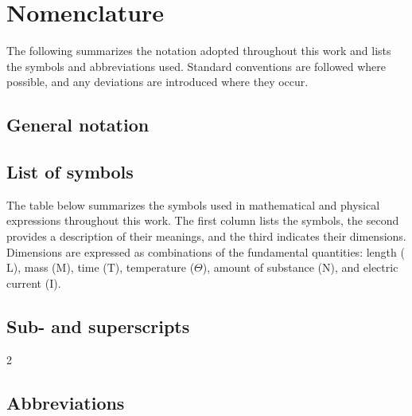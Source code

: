 %
%
%
\begingroup
\renewcommand{\glossarysection}[2][]{}

\chapter*{Nomenclature}

The following summarizes the notation adopted throughout this work and lists the symbols and abbreviations used. 
Standard conventions are followed where possible, and any deviations are introduced where they occur. 

\section*{General notation}

\blindtext[1]

\section*{List of symbols}

The table below summarizes the symbols used in mathematical and physical expressions throughout this work. 
The first column lists the symbols, the second provides a description of their meanings, and the third indicates their dimensions. 
Dimensions are expressed as combinations of the fundamental quantities: length (\(\mathrm{L}\)), mass (\(\mathrm{M}\)), time (\(\mathrm{T}\)), temperature (\(\Theta\)), amount of substance (\(\mathrm{N}\)), and electric current (\(\mathrm{I}\)).

\printunsrtglossary[
  type=symbols,
  style=fstlong3col,
  numberedsection=false,
  nonumberlist=true,
]

\section*{Sub- and superscripts}

\begin{multicols}{2}
  \printunsrtglossary[
    type=scripts,
    style={fstmcol},
    numberedsection=false,
    nonumberlist=true
]
\end{multicols}

\section*{Abbreviations}

\printunsrtglossary[
  type=abbreviations,
  style={fstlong2col},
  numberedsection=false,
  nonumberlist=true,
]

\endgroup
\cleardoublepage
